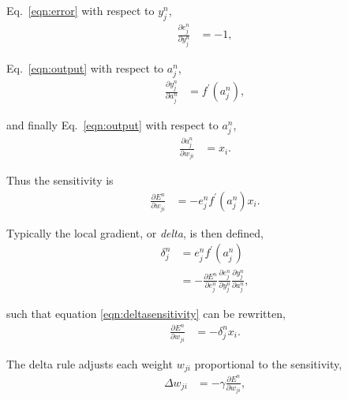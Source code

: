 \documentclass[thesis]{subfiles}
\begin{document}
Eq.~\ref{eqn:error} with respect to $y^n_j$,
\begin{equation}
\begin{aligned}
    \frac{\partial e^n_j}{\partial y^n_j} &= -1,
\end{aligned}
\end{equation}

Eq.~\ref{eqn:output} with respect to $a^n_j$,
\begin{equation}
\begin{aligned}
   \frac{\partial y^n_j}{\partial a^n_j}  &= f^\prime\left( a^n_j \right),
\end{aligned}
\end{equation}

and finally Eq.~\ref{eqn:output} with respect to $a^n_j$,
\begin{equation}
\begin{aligned}
   \frac{\partial a^n_j}{\partial w_{ji}} &= x_i.
\end{aligned}
\end{equation}

Thus the sensitivity is
\begin{equation}
\label{eqn:deltasensitivity}
\begin{aligned}
    \frac{\partial E^n}{\partial w_{ji}} &= - e^n_j  f^\prime\left( a^n_j \right) x_i.
\end{aligned}
\end{equation}

Typically the local gradient, or \emph{delta}, is then defined,
\begin{equation}
\label{eqn:delta}
\begin{aligned}
    \delta^n_j &= e^n_j  f^\prime\left( a^n_j \right)\\
    &= -\frac{\partial E^n}{\partial e^n_j}\frac{\partial e^n_j}{\partial y^n_j} \frac{\partial y^n_j}{\partial a^n_j},
\end{aligned}
\end{equation}

such that equation \ref{eqn:deltasensitivity} can be rewritten,
\begin{equation}
\begin{aligned}
    \frac{\partial E^n}{\partial w_{ji}} &= -\delta^n_j x_i.
\end{aligned}
\end{equation}


The delta rule adjusts each weight $w_{ji}$ proportional to the sensitivity, 
\begin{equation}
\begin{aligned}
    \Delta w_{ji} &= -\gamma \frac{\partial E^n}{\partial w_{ji}},
\end{aligned}
\end{equation}
\end{document}
